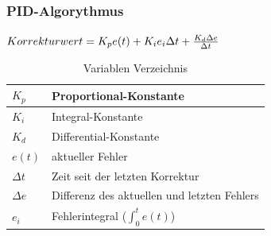\subsubsection{PID-Algorythmus}
\begin{minipage}[l]{0.5\textwidth}
  \begin{math}
    Korrekturwert = K_p e(t) + K_i e_i \Delta{t} + \frac{K_d \Delta{e}}{\Delta{t}} \\
  \end{math} 
\end{minipage}
\begin{minipage}[r]{0.49\textwidth}
  \begin{table}[H]
    \centering
  \settowidth{}
  \setlength\extrarowheight{2pt}
  \begin{tabulary}{1.0\textwidth}{|L|L|}
    \hline
    \begin{math} K_p \end{math} & Proportional-Konstante\\
    \hline
    \begin{math} K_i \end{math} & Integral-Konstante\\
    \hline
    \begin{math} K_d \end{math} & Differential-Konstante\\
    \hline
    \begin{math} e(t) \end{math} & aktueller Fehler\\
    \hline
    \begin{math} \Delta{t} \end{math} & Zeit seit der letzten Korrektur\\
    \hline
    \begin{math} \Delta{e} \end{math} & Differenz des aktuellen und letzten Fehlers\\
    \hline
    \begin{math} e_i \end{math} & Fehlerintegral (\begin{math} \int_{0}^t e(t) \end{math})\\
    \hline
  \end{tabulary}
  \caption{Variablen Verzeichnis}
\end{table}
\end{minipage}